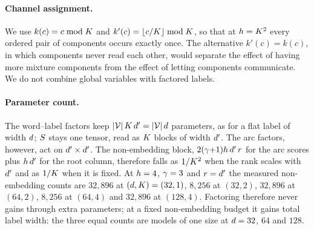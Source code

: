 \paragraph{Channel assignment.}
We use $k(c) = c \bmod K$ and $k'(c) = \lfloor c/K\rfloor \bmod K$, so that at
$h = K^2$ every ordered pair of components occurs exactly once. The alternative
$k'(c) = k(c)$, in which components never read each other, would separate the effect of having
more mixture components from the effect of letting components communicate. We do not combine global variables with factored labels.

\paragraph{Parameter count.}
The word--label factors keep $|\mathcal{V}|\,K\,d' = |\mathcal{V}|\,d$ parameters, as for a
flat label of width $d$; $S$ stays one tensor, read as $K$ blocks of width
$d'$. The arc factors, however, act on $d'\times d'$. The non-embedding block,
$2(\gamma{+}1)h\,d'\,r$ for the arc scores plus $h\,d'$ for the root
column, therefore falls as $1/K^2$ when the rank scales with $d'$ and as $1/K$
when it is fixed. At $h=4$, $\gamma=3$ and $r=d'$ the measured non-embedding counts
are $32{,}896$ at $(d,K) = (32,1)$, $8{,}256$ at $(32,2)$, $32{,}896$ at $(64,2)$,
$8{,}256$ at $(64,4)$ and $32{,}896$ at $(128,4)$. Factoring therefore never gains through extra
parameters; at a fixed non-embedding budget it gains total label width: the three equal counts
are models of one size at $d = 32$, $64$ and $128$.
